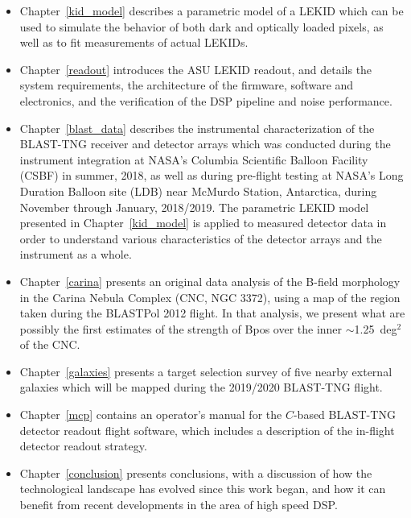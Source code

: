 \begin{itemize}
\item Chapter~\ref{kid_model} describes a parametric model of a LEKID which can be used to simulate the behavior of both dark and optically loaded pixels, as well as to fit measurements of actual LEKIDs.

\item Chapter~\ref{readout} introduces the ASU LEKID readout, and details the system requirements, the architecture of the firmware, software and electronics, and the verification of the DSP pipeline and noise performance.

\item Chapter~\ref{blast_data} describes the instrumental characterization of the BLAST-TNG receiver and detector arrays which was conducted during the instrument integration at NASA's Columbia Scientific Balloon Facility (CSBF) in summer, 2018, as well as during pre-flight testing at NASA's Long Duration Balloon site (LDB) near McMurdo Station, Antarctica, during November through January, 2018/2019. The parametric LEKID model presented in Chapter~\ref{kid_model} is applied to measured detector data in order to understand various characteristics of the detector arrays and the instrument as a whole.

\item Chapter~\ref{carina} presents an original data analysis of the B-field morphology in the Carina Nebula Complex (CNC, NGC 3372), using a map of the region taken during the BLASTPol 2012 flight. In that analysis, we present what are possibly the first estimates of the strength of \gls{Bpos} over the inner $\sim$1.25~deg$^{2}$ of the CNC.

\item Chapter~\ref{galaxies} presents a target selection survey of five nearby external galaxies which will be mapped during the 2019/2020 BLAST-TNG flight.

\item Chapter~\ref{mcp} contains an operator's manual for the $C$-based BLAST-TNG detector readout flight software, which includes a description of the in-flight detector readout strategy.

\item Chapter~\ref{conclusion} presents conclusions, with a discussion of how the technological landscape has evolved since this work began, and how it can benefit from recent developments in the area of high speed DSP.

\end{itemize}
